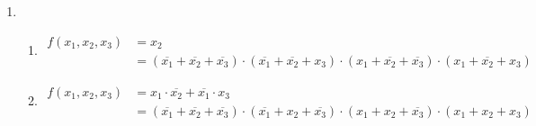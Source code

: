 \documentclass[a4paper]{article}
\begin{document}
\begin{enumerate}[label=\alph*)]
	\item 
	\begin{enumerate}[label=\roman*)]
		\item 
		\begin{equation}
		\begin{aligned}
			f(x_1, x_2, x_3) &= x_2 \\
			&= (\overline{x_1} + \overline{x_2} + \overline{x_3}) \cdot (\overline{x_1} + \overline{x_2} + x_3) \cdot (x_1 + \overline{x_2} + \overline{x_3}) \cdot (x_1 + \overline{x_2} + x_3)
		\end{aligned}
		\end{equation}
		
		\item 
		\begin{equation}
		\begin{aligned}
		f(x_1, x_2, x_3) &= x_1 \cdot \overline{x_2} + \overline{x_1} \cdot x_3 \\
		&= (\overline{x_1} + \overline{x_2} + \overline{x_3}) \cdot (\overline{x_1} + x_2 + \overline{x_3}) \cdot (x_1 + x_2 + \overline{x_3}) \cdot (x_1 + x_2 + x_3)
		\end{aligned}
		\end{equation}
	\end{enumerate}
\end{enumerate}
\clearpage
\end{document}
